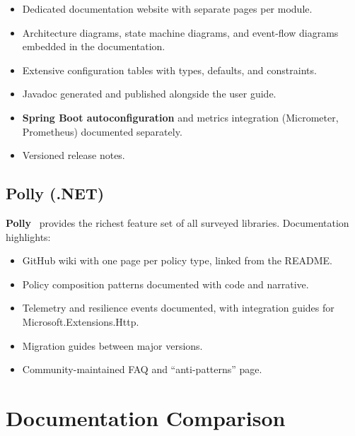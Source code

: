 \begin{itemize}[leftmargin=*, label=\textbullet]
    \item Dedicated documentation website with separate pages per module.
    \item Architecture diagrams, state machine diagrams, and event-flow
          diagrams embedded in the documentation.
    \item Extensive configuration tables with types, defaults, and constraints.
    \item Javadoc generated and published alongside the user guide.
    \item \textbf{Spring Boot autoconfiguration} and metrics integration
          (Micrometer, Prometheus) documented separately.
    \item Versioned release notes.
\end{itemize}

\subsection{Polly (.NET)}

\textbf{Polly}~\cite{polly} provides the richest feature set of all surveyed
libraries.  Documentation highlights:

\begin{itemize}[leftmargin=*, label=\textbullet]
    \item GitHub wiki with one page per policy type, linked from the README.
    \item Policy composition patterns documented with code and narrative.
    \item Telemetry and resilience events documented, with integration guides
          for Microsoft.Extensions.Http.
    \item Migration guides between major versions.
    \item Community-maintained FAQ and ``anti-patterns'' page.
\end{itemize}

\section{Documentation Comparison}
\label{sec:documentation-comparison}

